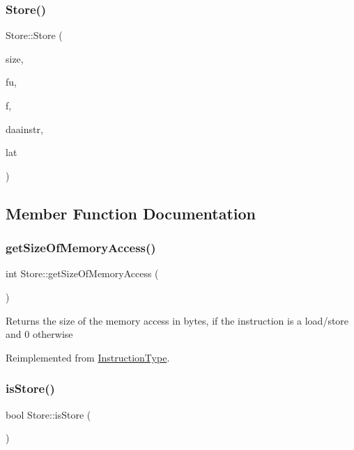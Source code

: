 \subsubsection{\texorpdfstring{Store()}{Store()}}
{\footnotesize\ttfamily Store\+::\+Store (\begin{DoxyParamCaption}\item[{int}]{size,  }\item[{const string \&}]{fu,  }\item[{const set$<$ \hyperlink{classInstructionFormat}{Instruction\+Format} $\ast$$>$ \&}]{f,  }\item[{\hyperlink{classDAAInstruction}{D\+A\+A\+Instruction} $\ast$}]{daainstr,  }\item[{int}]{lat }\end{DoxyParamCaption})}



\subsection{Member Function Documentation}
\mbox{\label{classStore_a1b788e1fc3364a4eb304a2611ad37415}} 
\subsubsection{\texorpdfstring{get\+Size\+Of\+Memory\+Access()}{getSizeOfMemoryAccess()}}
{\footnotesize\ttfamily int Store\+::get\+Size\+Of\+Memory\+Access (\begin{DoxyParamCaption}{ }\end{DoxyParamCaption})\hspace{0.3cm}{\ttfamily [virtual]}}

Returns the size of the memory access in bytes, if the instruction is a load/store and 0 otherwise 

Reimplemented from \hyperlink{classInstructionType_a40c94ccf0b13f186524e06972f08bca3}{Instruction\+Type}.

\mbox{\label{classStore_a773c447c4ac4b781ea6d18d91ff3dd50}} 
\subsubsection{\texorpdfstring{is\+Store()}{isStore()}}
{\footnotesize\ttfamily bool Store\+::is\+Store (\begin{DoxyParamCaption}{ }\end{DoxyParamCaption})\hspace{0.3cm}{\ttfamily [virtual]}}

